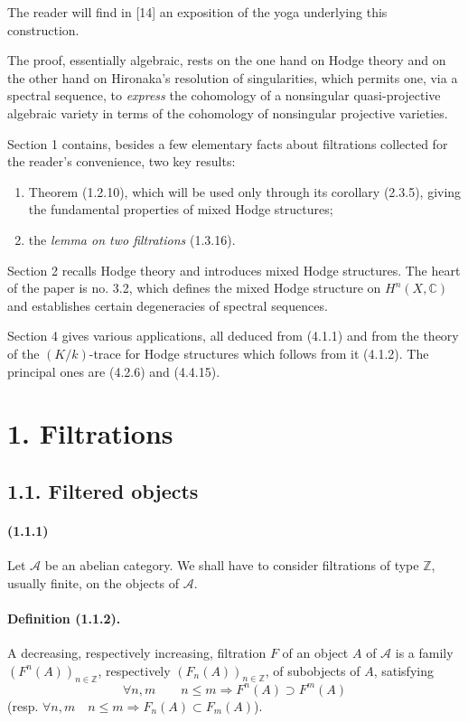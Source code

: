 \documentclass[10pt]{article}
\newcommand{\C}{\mathbb C}
\newcommand{\Z}{\mathbb Z}
\newcommand{\calA}{\mathcal A}
\begin{document}
The reader will find in [14] an exposition of the yoga underlying this construction.

The proof, essentially algebraic, rests on the one hand on Hodge theory and on the other hand on Hironaka's resolution of singularities, which permits one, via a spectral sequence, to \emph{express} the cohomology of a nonsingular quasi-projective algebraic variety in terms of the cohomology of nonsingular projective varieties.

Section 1 contains, besides a few elementary facts about filtrations collected for the reader's convenience, two key results:
\begin{enumerate}[label=\alph*)]
\item Theorem (1.2.10), which will be used only through its corollary (2.3.5), giving the fundamental properties of mixed Hodge structures;
\item the \emph{lemma on two filtrations} (1.3.16).
\end{enumerate}
Section 2 recalls Hodge theory and introduces mixed Hodge structures. The heart of the paper is no. 3.2, which defines the mixed Hodge structure on $H^n(X,\C)$ and establishes certain degeneracies of spectral sequences.

Section 4 gives various applications, all deduced from (4.1.1) and from the theory of the $(K/k)$-trace for Hodge structures which follows from it (4.1.2). The principal ones are (4.2.6) and (4.4.15).

\section*{1. Filtrations}
\subsection*{1.1. Filtered objects}

\paragraph{(1.1.1)} Let $\calA$ be an abelian category. We shall have to consider filtrations of type $\Z$, usually finite, on the objects of $\calA$.

\paragraph{Definition (1.1.2).} A decreasing, respectively increasing, filtration $F$ of an object $A$ of $\calA$ is a family $(F^n(A))_{n\in\Z}$, respectively $(F_n(A))_{n\in\Z}$, of subobjects of $A$, satisfying
\[
\forall n,m\qquad n\le m\Rightarrow F^n(A)\supset F^m(A)
\]
(resp. $\forall n,m\quad n\le m\Rightarrow F_n(A)\subset F_m(A)$).
\end{document}
